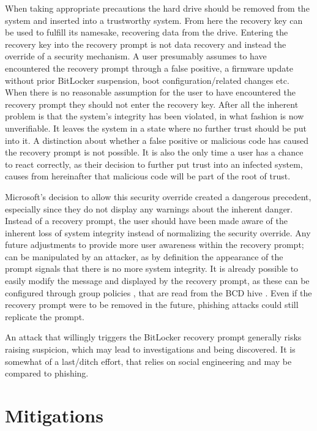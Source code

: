 When taking appropriate precautions the hard drive should be removed from the system and inserted into a trustworthy system.
From here the recovery key can be used to fulfill its namesake, recovering data from the drive.
Entering the recovery key into the recovery prompt is not data recovery and instead the override of a security mechanism.
A user presumably assumes to have encountered the recovery prompt through a false positive, a firmware update without prior BitLocker suspension, boot configuration\-/related changes etc.
When there is no reasonable assumption for the user to have encountered the recovery prompt they should not enter the recovery key.
After all the inherent problem is that the system's integrity has been violated, in what fashion is now unverifiable.
It leaves the system in a state where no further trust should be put into it.
A distinction about whether a false positive or malicious code has caused the recovery prompt is not possible.
It is also the only time a user has a chance to react correctly, as their decision to further put trust into an infected system, causes from hereinafter that malicious code will be part of the root of trust.

Microsoft's decision to allow this security override created a dangerous precedent, especially since they do not display any warnings about the inherent danger.
Instead of a recovery prompt, the user should have been made aware of the inherent loss of system integrity instead of normalizing the security override.
Any future adjustments to provide more user awareness within the recovery prompt; can be manipulated by an attacker, as by definition the appearance of the prompt signals that there is no more system integrity.
It is already possible to easily modify the message and  displayed by the recovery prompt, as these can be configured through group policies \cite{microsoft-windows-bitlocker-group-policy-settings-url}, that are read from the \ac{BCD} hive \cite{microsoft-windows-bcd-settings-and-bitlocker}.
Even if the recovery prompt were to be removed in the future, phishing attacks could still replicate the prompt.

An attack that willingly triggers the BitLocker recovery prompt generally risks raising suspicion, which may lead to investigations and being discovered.
It is somewhat of a last\-/ditch effort, that relies on social engineering and may be compared to phishing.

\section{Mitigations}


